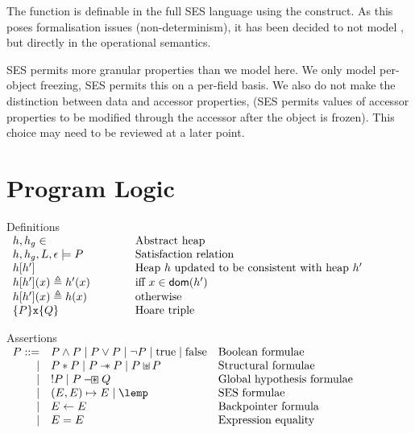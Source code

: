 \documentclass[a4paper]{article}
\begin{document}
The  function is definable in the full SES language using the
 construct. As this poses formalisation issues (non-determinism),
it has been decided to not model , but  directly in the
operational semantics.

SES permits more granular properties than we model here. We only model
per-object freezing, SES permits this on a per-field basis. We also do not make
the distinction between data and accessor properties, (SES permits values of
accessor properties to be modified through the accessor after the object is
frozen). This choice may need to be reviewed at a later point.

\section{Program Logic}

\newcommand{\defline}[2]{#1 & \qquad & \text{#2}\\}
\begin{display}{Definitions}
  $\begin{array}{lll}
    \defline{h,h_g \in}{Abstract heap}
    \defline{h,h_g,L,\env \satisfies P}{Satisfaction relation}
    \defline{h[h']}{Heap $h$ updated to be consistent with heap $h'$}
    \defline{h[h'](x) \triangleq h'(x)}{iff $x \in \dom(h')$}
    \defline{h[h'](x) \triangleq h(x)}{otherwise}
    \defline{\tr{P}{\js{x}}{Q}}{Hoare triple}
  \end{array}$
\end{display}

\newcommand{\asrtline}[3][\pipe]{#1 & #2 & \text{#3}\\}
\begin{display}{Assertions}
  $\begin{array}{rll}
    \asrtline[P ::=]{P \land P \pipe P \lor P \pipe \lnot P \pipe \true \pipe
    \false}{Boolean formulae}
    \asrtline{P \sep P \pipe P \wand P \pipe P \sepish P}{Structural formulae}
    \asrtline{\upd P \pipe P \hysep Q}{Global hypothesis formulae}
    \asrtline{(E,E) \pointsto E \pipe \lemp}{SES formulae}
    \asrtline{E \bp E}{Backpointer formula}
    \asrtline{E = E}{Expression equality}
  \end{array}$
\end{display}
\end{document}
